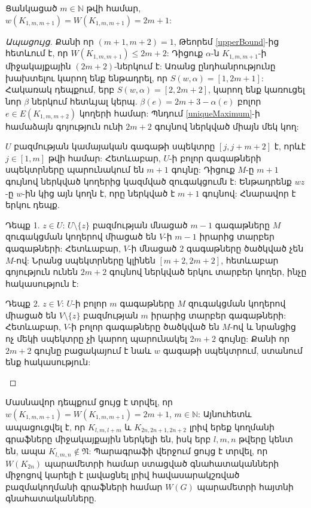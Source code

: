 \begin{hide}
\begin{theorem}
\label{WSymm}
Ցանկացած $m\in \mathbb{N}$ թվի համար, $w(K_{1,m,m+1}) = W(K_{1,m,m+1}) = 2m+1$:
\end{theorem}
\begin{proof}[Ապացույց]
Քանի որ $(m+1,m+2)=1$, Թեորեմ \ref{upperBound}-ից հետևում է, որ $W(K_{1,m,m+1}) \leq 2m+2$: Դիցուք $\alpha$-ն $K_{1,m,m+1}$-ի միջակայքային $(2m+2)$-ներկում է: Առանց ընդհանրությունը խախտելու կարող ենք ենթադրել, որ $S(w,\alpha)=[1,2m+1]$: Հակառակ դեպքում, երբ $S(w,\alpha)=[2,2m+2]$, կարող ենք կառուցել նոր $\beta$ ներկում հետևյալ կերպ. $\beta(e) = 2m+3 - \alpha(e)$ բոլոր $e \in E(K_{1,m,m+2})$ կողերի համար:	Պնդում \ref{uniqueMaximum}-ի համաձայն գոյություն ունի $2m+2$ գույնով ներկված միայն մեկ կող:

$U$ բազմության կամայական գագաթի սպեկտրը $[j, j+m+2]$ է, որևէ $j \in [1, m]$ թվի համար: Հետևաբար, $U$-ի բոլոր գագաթների սպեկտրները պարունակում են $m+1$ գույնը: Դիցուք $M$-ը $m+1$ գույնով ներկված կողերից կազմված զուգակցումն է: Ենթադրենք $wz$-ը $w$-ին կից այն կողն է, որը ներկված է $m+1$ գույնով: Հնարավոր է երկու դեպք.
\begin{description}
\item{Դեպք 1.} $z \in U$: $U\setminus\{z\}$ բազմության մնացած $m-1$ գագաթները $M$ զուգակցման կողերով միացած են $V$-ի $m-1$ իրարից տարբեր գագաթների: Հետևաբար, $V$-ի մնացած $2$ գագաթները ծածկված չեն $M$-ով: Նրանց սպեկտրները կլինեն $[m+2,2m+2]$, հետևաբար գոյություն ունեն $2m+2$ գույնով ներկված երկու տարբեր կողեր, ինչը հակասություն է:
\item{Դեպք 2.} $z \in V$: $U$-ի բոլոր $m$ գագաթները $M$ զուգակցման կողերով միացած են $V \setminus \{z\}$ բազմության $m$ իրարից տարբեր գագաթների: Հետևաբար, $V$-ի բոլոր գագաթները ծածկված են $M$-ով և նրանցից ոչ մեկի սպեկտրը չի կարող պարունակել $2m+2$ գույնը: Քանի որ $2m+2$ գույնը բացակայում է նաև $w$ գագաթի սպեկտրում, ստանում ենք հակասություն:
\end{description}
\end{proof}
\end{hide}

Մասնավոր դեպքում ցույց է տրվել, որ $w(K_{1,m,m+1}) = W(K_{1,m,m+1}) = 2m+1$, $m\in \mathbb{N}$: Այնուհետև ապացուցվել է, որ $K_{l,m,l+m}$ և $K_{2n,2n+1,2n+2}$ լրիվ երեք կողմանի գրաֆները միջակայքային ներկելի են, իսկ երբ $l,m,n$ թվերը կենտ են, ապա $K_{l,m,n} \notin \mathfrak{N}$: 
Պարագրաֆի վերջում ցույց է տրվել, որ $W(K_{2n})$ պարամետրի համար ստացված գնահատականների միջոցով կարելի է լավացնել լրիվ հավասարակշռված բազմակողմանի գրաֆների համար $W(G)$ պարամետրի հայտնի գնահատականները.

